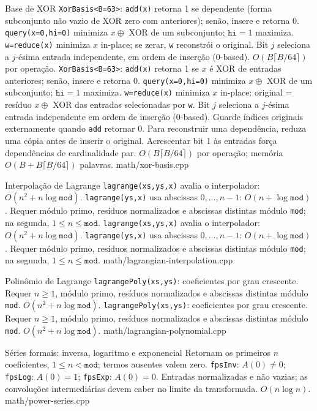 \templateentry
{Base de XOR}
{\texttt{XorBasis<B=63>}: \texttt{add(x)} retorna 1 se dependente (forma subconjunto não vazio de XOR zero com anteriores); senão, insere e retorna 0. \texttt{query(x=0,hi=0)} minimiza $x\oplus$ XOR de um subconjunto; $\mathtt{hi}=1$ maximiza. \texttt{w=reduce(x)} minimiza $x$ in-place; se zerar, \texttt{w} reconstrói o original. Bit $j$ seleciona a $j$-ésima entrada independente, em ordem de inserção (0-based). $O(B\lceil B/64\rceil)$ por operação.}
{\texttt{XorBasis<B=63>}: \texttt{add(x)} retorna 1 se $x$ é XOR de entradas anteriores; senão, insere e retorna 0. \texttt{query(x=0,hi=0)} minimiza $x\oplus$ XOR de um subconjunto; $\mathtt{hi}=1$ maximiza. \texttt{w=reduce(x)} minimiza $x$ in-place: original = resíduo $x\oplus$ XOR das entradas selecionadas por \texttt{w}. Bit $j$ seleciona a $j$-ésima entrada independente em ordem de inserção (0-based). Guarde índices originais externamente quando \texttt{add} retornar 0. Para reconstruir uma dependência, reduza uma cópia antes de inserir o original. Acrescentar bit 1 às entradas força dependências de cardinalidade par. $O(B\lceil B/64\rceil)$ por operação; memória $O(B+B\lceil B/64\rceil)$ palavras.}
{math/xor-basis.cpp}

\templateentry
{Interpolação de Lagrange}
{\texttt{lagrange(xs,ys,x)} avalia o interpolador: $O(n^2+n\log \mathtt{mod})$. \texttt{lagrange(ys,x)} usa abscissas $0,\ldots,n-1$: $O(n+\log \mathtt{mod})$. Requer módulo primo, resíduos normalizados e abscissas distintas módulo \texttt{mod}; na segunda, $1\le n\le \mathtt{mod}$.}
{\texttt{lagrange(xs,ys,x)} avalia o interpolador: $O(n^2+n\log \mathtt{mod})$. \texttt{lagrange(ys,x)} usa abscissas $0,\ldots,n-1$: $O(n+\log \mathtt{mod})$. Requer módulo primo, resíduos normalizados e abscissas distintas módulo \texttt{mod}; na segunda, $1\le n\le \mathtt{mod}$.}
{math/lagrangian-interpolation.cpp}

\templateentry
{Polinômio de Lagrange}
{\texttt{lagrangePoly(xs,ys)}: coeficientes por grau crescente. Requer $n\ge1$, módulo primo, resíduos normalizados e abscissas distintas módulo \texttt{mod}. $O(n^2+n\log \mathtt{mod})$.}
{\texttt{lagrangePoly(xs,ys)}: coeficientes por grau crescente. Requer $n\ge1$, módulo primo, resíduos normalizados e abscissas distintas módulo \texttt{mod}. $O(n^2+n\log \mathtt{mod})$.}
{math/lagrangian-polynomial.cpp}

\ifextended

\templateentry
{Séries formais: inversa, logaritmo e exponencial}
{}
{Retornam os primeiros $n$ coeficientes, $1\le n<\mathtt{mod}$; termos ausentes valem zero. \texttt{fpsInv}: $A(0)\ne0$; \texttt{fpsLog}: $A(0)=1$; \texttt{fpsExp}: $A(0)=0$. Entradas normalizadas e não vazias; as convoluções intermediárias devem caber no limite da transformada. $O(n\log n)$.}
{math/power-series.cpp}

